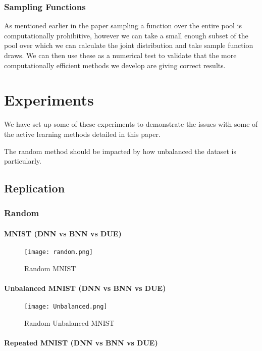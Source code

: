 \documentclass[12pt, a4paper]{report}
\theoremstyle{definition}
\theoremstyle{definition}
\theoremstyle{definition}
\begin{document}
\subsection{Sampling Functions}

As mentioned earlier in the paper sampling a function over the entire pool is computationally prohibitive, however we can take a small enough subset of the pool over which we can calculate the joint distribution and take sample function draws.
We can then use these as a numerical test to validate that the more computationally efficient methods we develop are giving correct results.


\chapter{Experiments}
\label{sec:Experiments}

We have set up some of these experiments to demonstrate the issues with some of the active learning methods detailed in this paper.

The random method should be impacted by how unbalanced the dataset is particularly.

\section{Replication}

\subsection{Random}

\subsubsection{MNIST (DNN vs BNN vs DUE)}

\begin{figure}[H]
\centering
\texttt{[image: random.png]}
\caption{Random MNIST}
\end{figure}

\subsubsection{Unbalanced MNIST (DNN vs BNN vs DUE)}

\begin{figure}[H]
\centering
\texttt{[image: Unbalanced.png]}
\caption{Random Unbalanced MNIST}
\end{figure}
\subsubsection{Repeated MNIST (DNN vs BNN vs DUE)}
\end{document}
